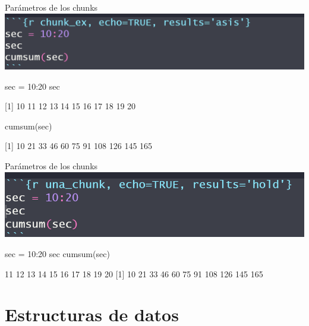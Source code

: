 \documentclass[
  ignorenonframetext,
  aspectratio=169]{beamer}
\newenvironment{Shaded}{\begin{snugshade}}{\end{snugshade}}
\newcommand{\DecValTok}[1]{\textcolor[rgb]{0.00,0.00,0.81}{#1}}
\newcommand{\FunctionTok}[1]{\textcolor[rgb]{0.00,0.00,0.00}{#1}}
\newcommand{\NormalTok}[1]{#1}
\newcommand{\OtherTok}[1]{\textcolor[rgb]{0.56,0.35,0.01}{#1}}
\newcommand{\SpecialCharTok}[1]{\textcolor[rgb]{0.00,0.00,0.00}{#1}}
\let\oldverbatim\verbatim
\let\endoldverbatim\endverbatim
\renewenvironment{verbatim}{\tiny\oldverbatim}{\endoldverbatim}
\begin{document}
\begin{frame}[fragile]{Parámetros de los chunks}
\protect\hypertarget{paruxe1metros-de-los-chunks-9}{}
\includegraphics[width=0.6\linewidth]{Imgs/parametros_chunk_5}

\begin{Shaded}
\begin{Highlighting}[]
\NormalTok{sec }\OtherTok{=} \DecValTok{10}\SpecialCharTok{:}\DecValTok{20}
\NormalTok{sec}
\end{Highlighting}
\end{Shaded}

{[}1{]} 10 11 12 13 14 15 16 17 18 19 20

\begin{Shaded}
\begin{Highlighting}[]
\FunctionTok{cumsum}\NormalTok{(sec)}
\end{Highlighting}
\end{Shaded}

{[}1{]} 10 21 33 46 60 75 91 108 126 145 165
\end{frame}

\begin{frame}[fragile]{Parámetros de los chunks}
\protect\hypertarget{paruxe1metros-de-los-chunks-10}{}
\includegraphics[width=0.6\linewidth]{Imgs/parametros_chunk_6}

\begin{Shaded}
\begin{Highlighting}[]
\NormalTok{sec }\OtherTok{=} \DecValTok{10}\SpecialCharTok{:}\DecValTok{20}
\NormalTok{sec}
\FunctionTok{cumsum}\NormalTok{(sec)}
\end{Highlighting}
\end{Shaded}

\begin{verbatim}
 [1] 10 11 12 13 14 15 16 17 18 19 20
 [1]  10  21  33  46  60  75  91 108 126 145 165
\end{verbatim}
\end{frame}

\hypertarget{estructuras-de-datos}{%
\section{Estructuras de datos}\label{estructuras-de-datos}}
\end{document}
